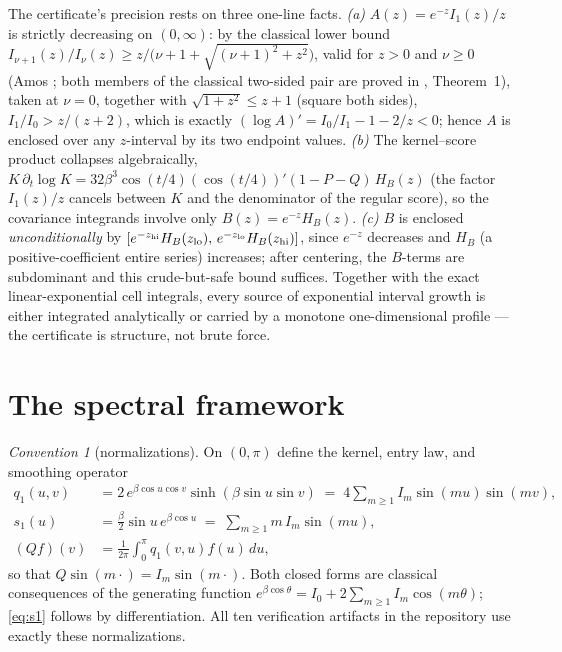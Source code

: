 \documentclass[11pt]{article}
\theoremstyle{remark}
\newtheorem{convention}[theorem]{Convention}
\newcommand{\dd}{\,d}
\begin{document}
The certificate's precision rests on three one-line facts. \emph{(a)}
$A(z)=e^{-z}I_1(z)/z$ is strictly decreasing on $(0,\infty)$: by the
classical lower bound $I_{\nu+1}(z)/I_\nu(z)\ge
z/\bigl(\nu+1+\sqrt{(\nu+1)^2+z^2}\bigr)$, valid for $z>0$ and
$\nu\ge0$ (Amos \cite{Amos}; both members of the classical two-sided
pair are proved in \cite{Segura2011}, Theorem~1), taken at $\nu=0$,
together with $\sqrt{1+z^2}\le z+1$ (square both sides),
$I_1/I_0>z/(z+2)$, which is
exactly $(\log A)'=I_0/I_1-1-2/z<0$; hence $A$ is enclosed over any
$z$-interval by its two endpoint values. \emph{(b)} The kernel--score
product collapses algebraically,
$K\,\partial_t\!\log K=32\beta^3\cos(t/4)(\cos(t/4))'(1-P-Q)\,H_B(z)$
(the factor $I_1(z)/z$ cancels between $K$ and the denominator of the
regular score), so the covariance integrands involve only
$B(z)=e^{-z}H_B(z)$. \emph{(c)} $B$ is enclosed \emph{unconditionally}
by $[e^{-z_{\rm hi}}H_B(z_{\rm lo}),\,e^{-z_{\rm lo}}H_B(z_{\rm hi})]$,
since $e^{-z}$ decreases and $H_B$ (a positive-coefficient entire
series) increases; after centering, the $B$-terms are subdominant and this
crude-but-safe bound suffices. Together with the exact linear-exponential
cell integrals, every source of exponential interval growth is either
integrated analytically or carried by a monotone one-dimensional
profile --- the certificate is structure, not brute force.



\section{The spectral framework}\label{sec:frame}

\begin{convention}[normalizations]\label{conv:norm}
On $(0,\pi)$ define the kernel, entry law, and smoothing operator
\begin{align}
q_1(u,v) &= 2\,e^{\beta\cos u\cos v}\sinh(\beta\sin u\sin v)
          \;=\; 4\sum_{m\ge1}I_m\sin(mu)\sin(mv), \label{eq:q1}\\
s_1(u)   &= \tfrac{\beta}{2}\sin u\,e^{\beta\cos u}
          \;=\; \sum_{m\ge1}m\,I_m\sin(mu), \label{eq:s1}\\
(Qf)(v)  &= \frac{1}{2\pi}\int_0^\pi q_1(v,u)f(u)\dd u ,\label{eq:Q}
\end{align}
so that $Q\sin(m\cdot)=I_m\sin(m\cdot)$. Both closed forms are classical
consequences of the generating function
$e^{\beta\cos\theta}=I_0+2\sum_{m\ge1}I_m\cos(m\theta)$; \eqref{eq:s1}
follows by differentiation. All ten verification artifacts in the
repository use exactly these normalizations.
\end{convention}
\end{document}
